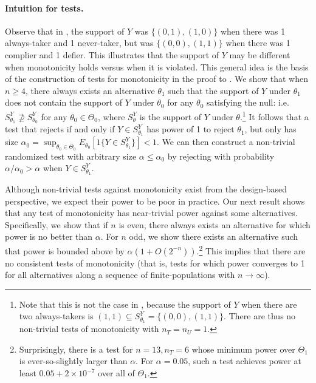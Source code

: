 \documentclass[12pt,reqno]{amsart}
\begin{document}
\paragraph{\textbf{Intuition for tests.}} Observe that in , the support of $Y$ was $\{(0,1), (1,0)\}$ when there was 1 always-taker and 1 never-taker, but was $\{(0,0),(1,1)\}$ when there was 1 complier and 1 defier. This illustrates that the support of $Y$ may be different when monotonicity holds versus when it is violated. This general idea is the basis of the construction of tests for monotonicity in the proof to . We show that when $n \geq 4$, there always exists an alternative $\theta_1$ such that the support of $Y$ under $\theta_1$ does not contain the support of $Y$ under $\theta_0$ for any $\theta_0$ satisfying the null: i.e. $S^Y_{\theta_1} \not\supseteq S^Y_{\theta_0}$ for any $\theta_0 \in \Theta_0$, where $S^Y_\theta$ is the support of $Y$ under $\theta$.\footnote{Note that this is not the case in , because the support of $Y$ when there are two always-takers is $(1,1) \subseteq S^Y_{\theta_1} = \{(0,0),(1,1)\}$. There are thus no non-trivial tests of monotonicity with $n_T = n_U = 1$.} It follows that a test that rejects if and only if $Y \in S^Y_{\theta_1}$ has power of 1 to reject $\theta_1$, but only has size $\alpha_0 = \sup_{\theta_0 \in \Theta_0} E_{\theta_0}[ 1\{ Y \in S^Y_{\theta_1} \} ] < 1$. We can then construct a non-trivial randomized test with arbitrary size $\alpha \leq \alpha_0$ by rejecting with probability $\alpha/\alpha_0 > \alpha$ when $Y \in S^Y_{\theta_1}$. 


Although non-trivial tests against monotonicity exist from the design-based perspective,
we expect their power to be poor in practice. Our next result shows that any test of
monotonicity has near-trivial power against some alternatives. Specifically, we show that if $n$ is even, there always exists an alternative for which power is no better than $\alpha$. For $n$ odd, we show there exists an alternative such that power is bounded above by $\alpha (1+ O(2^{-n}))$.\footnote{Surprisingly, there is a test for $n=13, n_T=6$ whose minimum power over $\Theta_1$ is ever-so-slightly larger than $\alpha$. For $\alpha=0.05$, such a test achieves power at least $0.05 + 2 \times 10^{-7}$ over all of $\Theta_1$.} This implies that there are no consistent tests of monotonicity (that is, tests for which power converges to 1 for all alternatives along a sequence of finite-populations with $n \to \infty$). 
\end{document}
